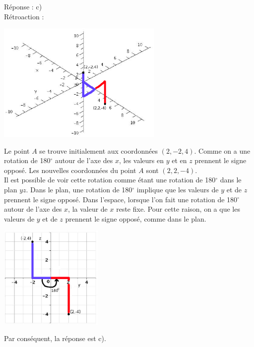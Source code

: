 \documentclass[letterpaper, 12pt]{article}
\begin{document}
R\'eponse : c)\\

R\'etroaction :\\
\begin{center}
 \includegraphics[width=8cm,bb=14 14 595 445]{Q2534r.eps}
\end{center}
Le point $A$ se trouve initialement aux coordonn\'ees $(2, -2, 4)$. Comme on a une rotation de 180$^{\circ}$ autour de l'axe des $x$, les valeurs en $y$ et en $z$ prennent le signe oppos\'e. Les nouvelles coordonn\'ees du point $A$ sont $(2, 2, -4)$.\\
Il est possible de voir cette rotation comme \'etant une rotation de 180$^{\circ}$ dans le plan $yz$. Dans le plan, une rotation de 180$^{\circ}$ implique que les valeurs de $y$ et de $z$ prennent le signe oppos\'e. Dans l'espace, lorsque l'on fait une rotation de 180$^{\circ}$ autour de l'axe des $x$, la valeur de $x$ reste fixe. Pour cette raison, on a que les valeurs de $y$ et de $z$ prennent le signe oppos\'e, comme dans le plan.\\
\begin{center}
 \includegraphics[width=5cm,bb=14 14 383 383]{Q2534.eps}
\end{center}
Par cons\'equent, la r\'eponse est c).\\
\end{document}
